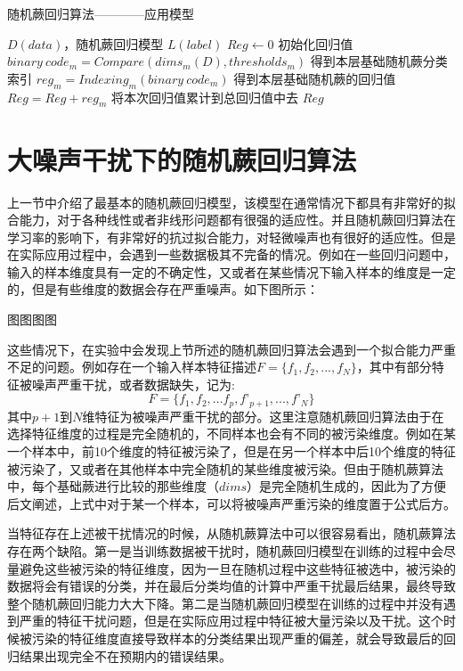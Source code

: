 \begin{algorithm}
\caption{随机蕨回归算法————应用模型}
\begin{algorithmic}[1]
\Require $D(data)$，随机蕨回归模型
\Ensure $L(label)$
\State $Reg\leftarrow 0$
\Comment 初始化回归值
	\State $binary\ code_m=Compare(dims_m(D), thresholds_m)$
	\Comment 得到本层基础随机蕨分类索引
	\State $reg_m=Indexing_m(binary\ code_m)$
	\Comment 得到本层基础随机蕨的回归值
	\State $Reg=Reg+reg_m$
	\Comment 将本次回归值累计到总回归值中去
\EndFor
\State \Return $Reg$
\end{algorithmic}
\end{algorithm}




\section{大噪声干扰下的随机蕨回归算法}

上一节中介绍了最基本的随机蕨回归模型，该模型在通常情况下都具有非常好的拟合能力，对于各种线性或者非线形问题都有很强的适应性。并且随机蕨回归算法在学习率的影响下，有非常好的抗过拟合能力，对轻微噪声也有很好的适应性。但是在实际应用过程中，会遇到一些数据极其不完备的情况。例如在一些回归问题中，输入的样本维度具有一定的不确定性，又或者在某些情况下输入样本的维度是一定的，但是有些维度的数据会存在严重噪声。如下图所示：

图图图图

这些情况下，在实验中会发现上节所述的随机蕨回归算法会遇到一个拟合能力严重不足的问题。例如存在一个输入样本特征描述$F=\{f_1,f_2,...,f_N\}$，其中有部分特征被噪声严重干扰，或者数据缺失，记为:
\begin{equation}
F=\{f_1,f_2,...f_p,f’_{p+1},...,f’_N\}
\end{equation}
其中$p+1$到$N$维特征为被噪声严重干扰的部分。这里注意随机蕨回归算法由于在选择特征维度的过程是完全随机的，不同样本也会有不同的被污染维度。例如在某一个样本中，前10个维度的特征被污染了，但是在另一个样本中后10个维度的特征被污染了，又或者在其他样本中完全随机的某些维度被污染。但由于随机蕨算法中，每个基础蕨进行比较的那些维度（$dims$）是完全随机生成的，因此为了方便后文阐述，上式中对于某一个样本，可以将被噪声严重污染的维度置于公式后方。

当特征存在上述被干扰情况的时候，从随机蕨算法中可以很容易看出，随机蕨算法存在两个缺陷。第一是当训练数据被干扰时，随机蕨回归模型在训练的过程中会尽量避免这些被污染的特征维度，因为一旦在随机过程中这些特征被选中，被污染的数据将会有错误的分类，并在最后分类均值的计算中严重干扰最后结果，最终导致整个随机蕨回归能力大大下降。第二是当随机蕨回归模型在训练的过程中并没有遇到严重的特征干扰问题，但是在实际应用过程中特征被大量污染以及干扰。这个时候被污染的特征维度直接导致样本的分类结果出现严重的偏差，就会导致最后的回归结果出现完全不在预期内的错误结果。

